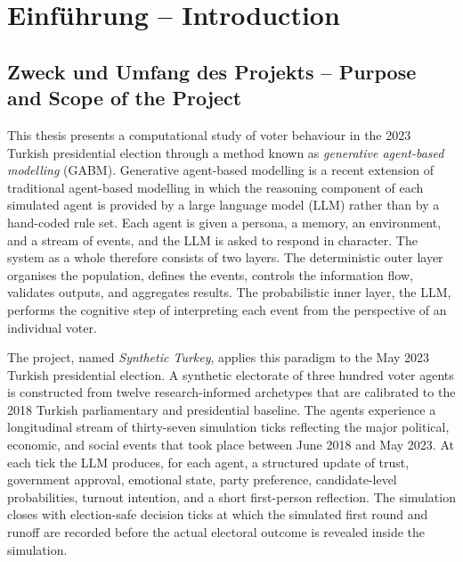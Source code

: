 \documentclass[12pt,a4paper]{report}
\begin{document}
\setcounter{page}{1}

\chapter{Einführung -- Introduction}
\label{ch:introduction}

\section{Zweck und Umfang des Projekts -- Purpose and Scope of the Project}
\label{sec:scope}

This thesis presents a computational study of voter behaviour in the 2023 Turkish presidential election through a method known as \emph{generative agent-based modelling} (GABM). Generative agent-based modelling is a recent extension of traditional agent-based modelling in which the reasoning component of each simulated agent is provided by a large language model (LLM) rather than by a hand-coded rule set. Each agent is given a persona, a memory, an environment, and a stream of events, and the LLM is asked to respond in character. The system as a whole therefore consists of two layers. The deterministic outer layer organises the population, defines the events, controls the information flow, validates outputs, and aggregates results. The probabilistic inner layer, the LLM, performs the cognitive step of interpreting each event from the perspective of an individual voter.

The project, named \emph{Synthetic Turkey}, applies this paradigm to the May 2023 Turkish presidential election. A synthetic electorate of three hundred voter agents is constructed from twelve research-informed archetypes that are calibrated to the 2018 Turkish parliamentary and presidential baseline. The agents experience a longitudinal stream of thirty-seven simulation ticks reflecting the major political, economic, and social events that took place between June 2018 and May 2023. At each tick the LLM produces, for each agent, a structured update of trust, government approval, emotional state, party preference, candidate-level probabilities, turnout intention, and a short first-person reflection. The simulation closes with election-safe decision ticks at which the simulated first round and runoff are recorded before the actual electoral outcome is revealed inside the simulation.
\end{document}
